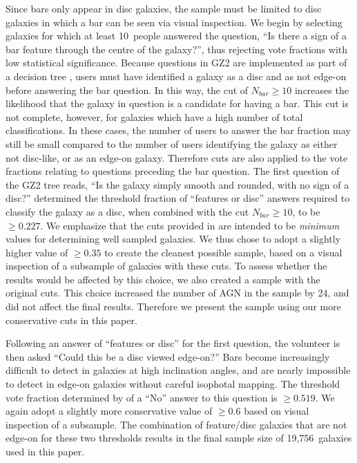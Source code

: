 Since bars only appear in disc galaxies, the sample must be limited to disc galaxies in which a bar can be seen via visual inspection. We begin by selecting galaxies for which at least 10~people answered the question, ``Is there a sign of a bar feature through the centre of the galaxy?'', thus rejecting vote fractions with low statistical significance. Because questions in GZ2 are implemented as part of a decision tree \citep{Willett2013}, users must have identified a galaxy as a disc and as not edge-on before answering the bar question. In this way, the cut of $N_{bar}\ge10$ increases the likelihood that the galaxy in question is a candidate for having a bar. This cut is not complete, however, for galaxies which have a high number of total classifications. In these cases, the number of users to answer the bar fraction may still be small compared to the number of users identifying the galaxy as either not disc-like, or as an edge-on galaxy. Therefore cuts are also applied to the vote fractions relating to questions preceding the bar question. The first question of the GZ2 tree reads, ``Is the galaxy simply smooth and rounded, with no sign of a disc?'' \citet{Willett2013} determined the threshold fraction of ``features or disc'' answers required to classify the galaxy as a disc, when combined with the cut $N_{bar}\ge10$, to be \pfeatures$\ge0.227$. We emphasize that the cuts provided in \citet{Willett2013} are intended to be \emph{minimum} values for determining well sampled galaxies. We thus chose to adopt a slightly higher value of \pfeatures$\ge0.35$ to create the cleanest possible sample, based on a visual inspection of a subsample of galaxies with these cuts. To assess whether the results would be affected by this choice, we also created a sample with the original \citet{Willett2013} cuts. This choice increased the number of AGN in the sample by 24, and did not affect the final results. Therefore we present the sample using our more conservative cuts in this paper. 

Following an answer of ``features or disc'' for the first question, the volunteer is then asked ``Could this be a disc viewed edge-on?'' Bars become increasingly difficult to detect in galaxies at high inclination angles, and are nearly impossible to detect in edge-on galaxies without careful isophotal mapping. The threshold vote fraction determined by \citet{Willett2013} of a ``No'' answer to this question is \pnotedgeon$\ge0.519$. We again adopt a slightly more conservative value of \pnotedgeon$\ge0.6$ based on visual inspection of a subsample. The combination of feature/disc galaxies that are not edge-on for these two thresholds results in the final sample size of 19,756~galaxies used in this paper. 

